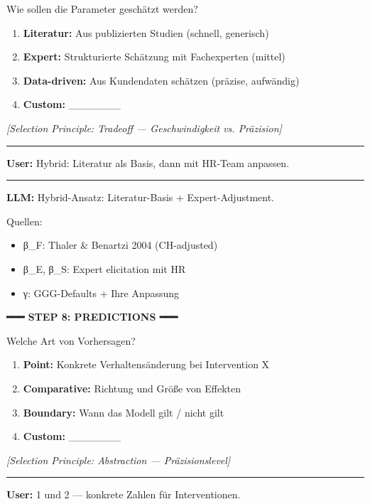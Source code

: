 \begin{tcolorbox}[colback=blue!5!white, colframe=blue!75!black,
    title=Example: GEFÜHRT Model Design (All 10 Steps), breakable]
Wie sollen die Parameter geschätzt werden?
\begin{enumerate}
\item \textbf{Literatur:} Aus publizierten Studien (schnell, generisch)
\item \textbf{Expert:} Strukturierte Schätzung mit Fachexperten (mittel)
\item \textbf{Data-driven:} Aus Kundendaten schätzen (präzise, aufwändig)
\item \textbf{Custom:} \_\_\_\_\_\_\_
\end{enumerate}

\textit{[Selection Principle: Tradeoff --- Geschwindigkeit vs. Präzision]}

\hrule
\vspace{0.3em}

\textbf{User:} Hybrid: Literatur als Basis, dann mit HR-Team anpassen.

\hrule
\vspace{0.3em}

\textbf{LLM:} Hybrid-Ansatz: Literatur-Basis + Expert-Adjustment.

Quellen:
\begin{itemize}[nosep]
\item β\_F: Thaler \& Benartzi 2004 (CH-adjusted)
\item β\_E, β\_S: Expert elicitation mit HR
\item γ: GGG-Defaults + Ihre Anpassung
\end{itemize}

\vspace{0.3em}
\textbf{━━━ STEP 8: PREDICTIONS ━━━}
\vspace{0.3em}

Welche Art von Vorhersagen?
\begin{enumerate}
\item \textbf{Point:} Konkrete Verhaltensänderung bei Intervention X
\item \textbf{Comparative:} Richtung und Größe von Effekten
\item \textbf{Boundary:} Wann das Modell gilt / nicht gilt
\item \textbf{Custom:} \_\_\_\_\_\_\_
\end{enumerate}

\textit{[Selection Principle: Abstraction --- Präzisionslevel]}

\hrule
\vspace{0.3em}

\textbf{User:} 1 und 2 --- konkrete Zahlen für Interventionen.


\end{tcolorbox}
